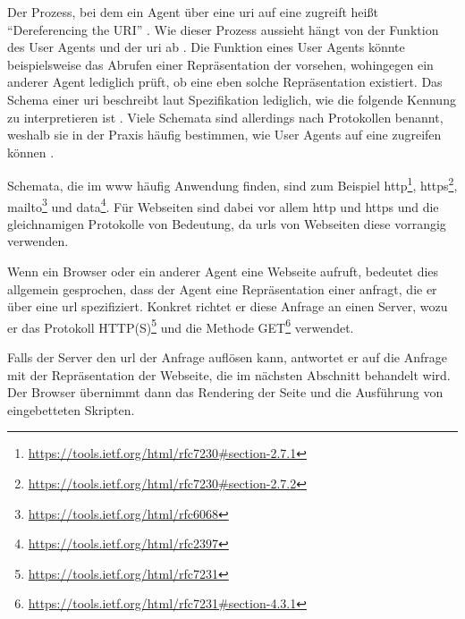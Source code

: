         Der Prozess, bei dem ein Agent über eine \gls{uri} auf eine {\resource}
        zugreift heißt "`Dereferencing the URI"' \cite[Kapitel 3.1]{w3c:wwwArch}.
        Wie dieser Prozess aussieht hängt von der Funktion des User Agents und der \gls{uri} ab
        \cite[Kapitel 3.1]{w3c:wwwArch}.
        Die Funktion eines User Agents könnte beispielsweise das Abrufen einer
        Repräsentation der {\resource} vorsehen, wohingegen ein anderer Agent
        lediglich prüft, ob eine eben solche Repräsentation existiert.
        Das Schema einer \gls{uri} beschreibt laut Spezifikation
        lediglich, wie die folgende Kennung zu interpretieren ist
        \cite[Kapitel 3.1, Seite 17]{rfc:3986}.
        Viele Schemata sind allerdings nach Protokollen benannt,
        weshalb sie in der Praxis häufig bestimmen,
        wie User Agents auf eine {\resource} zugreifen können
        \cite[Kapitel 3.1]{w3c:wwwArch}.
        
        Schemata, die im \gls{www} häufig Anwendung finden,
        sind zum Beispiel
        http\footnote{\url{https://tools.ietf.org/html/rfc7230\#section-2.7.1}},
        https\footnote{\url{https://tools.ietf.org/html/rfc7230\#section-2.7.2}},
        mailto\footnote{\url{https://tools.ietf.org/html/rfc6068}} und
        data\footnote{\url{https://tools.ietf.org/html/rfc2397}}.
        Für Webseiten sind dabei vor allem http und https
        und die gleichnamigen Protokolle von Bedeutung,
        da \glspl{url} von Webseiten diese vorrangig verwenden.

        Wenn ein Browser oder ein anderer Agent eine Webseite aufruft,
        bedeutet dies allgemein gesprochen, dass der Agent eine Repräsentation
        einer {\resource} anfragt, die er über eine \gls{url} spezifiziert.
        Konkret richtet er diese Anfrage an einen Server,
        wozu er das Protokoll HTTP(S)\footnote{\url{https://tools.ietf.org/html/rfc7231}} und die Methode
        GET\footnote{\url{https://tools.ietf.org/html/rfc7231\#section-4.3.1}} verwendet.

        Falls der Server den \gls{url} der Anfrage auflösen kann,
        antwortet er auf die Anfrage mit der Repräsentation der Webseite,
        die im nächsten Abschnitt behandelt wird.
        Der Browser übernimmt dann das Rendering der Seite und die Ausführung
        von eingebetteten Skripten.

